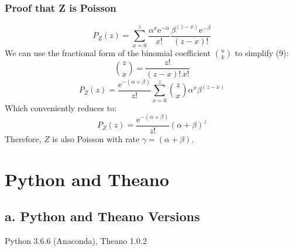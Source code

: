 \documentclass[9pt,twocolumn]{article}
\begin{document}
		\subsubsection*{Proof that Z is Poisson}
			\begin{equation}
				P_Z(z) = \sum^{z}_{x=0} \frac{\alpha^{x}\mathrm{e}^{-\alpha}}{x!} \frac{\beta^{(z-x)}\mathrm{e}^{-\beta}}{(z-x)!}
			\end{equation}
			We can use the fractional form of the binomial coefficient $\binom{n}{k}$ to simplify (9):
			\begin{equation}
				\binom{z}{x} = \frac{z!}{(z-x)!\,x!}
			\end{equation}
			\begin{equation}
				P_Z(z) = \frac{\mathrm{e}^{-(\alpha+\beta)}}{z!}\sum^{z}_{x=0}\binom{z}{x}\alpha^{x}\beta^{(z-x)}
			\end{equation}
			Which conveniently reduces to:
			\begin{equation}
				P_Z(z) = \frac{\mathrm{e}^{-(\alpha+\beta)}}{z!}(\alpha + \beta)^{z}
			\end{equation}
			Therefore, $Z$ is also Poisson with rate $\gamma = (\alpha + \beta)$.
			
\section{Python and Theano}
	\subsection*{a. Python and Theano Versions}
	Python 3.6.6 (Anaconda), Theano 1.0.2
\end{document}
